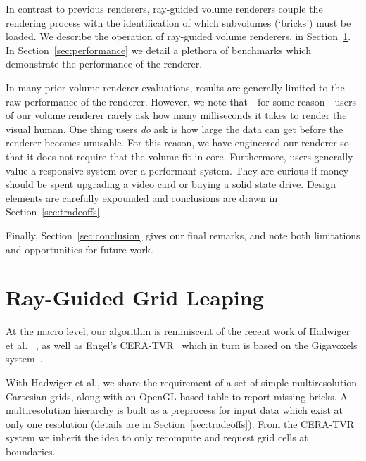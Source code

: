
In contrast to previous renderers, ray-guided volume renderers couple
the rendering process with the identification of which subvolumes
(`bricks') must be loaded.  We describe the operation of ray-guided
volume renderers, in Section~\ref{sec:algorithm}.
In Section~\ref{sec:performance} we detail a plethora of benchmarks
which demonstrate the performance of the renderer.

In many prior volume renderer evaluations, results are generally
limited to the raw performance of the renderer.  However, we note
that---for some reason---users of our volume renderer rarely ask how
many milliseconds it takes
to render the visual human.  One thing users \emph{do} ask is how large
the data can get before the renderer becomes unusable. For this reason,
we have engineered our renderer so that it does not require that the
volume fit in core.  Furthermore, users generally value a responsive
system over a performant system.  They are curious if money should be
spent upgrading a video card or buying a solid state drive.  Design
elements are carefully expounded and conclusions are drawn in
Section~\ref{sec:tradeoffs}.

Finally, Section~\ref{sec:conclusion} gives our final remarks, and note
both limitations and opportunities for future work.

\section{Ray-Guided Grid Leaping}
\label{sec:algorithm}

At the macro level, our algorithm is reminiscent of the recent work of
Hadwiger et
al. ~\cite{Hadwiger:2012:Guided}, as well as Engel's
CERA-TVR~\cite{Engel:2012:CERA} which in turn is based on the
Gigavoxels
system~\cite{Crassin:2009:Gigavoxels}.

With Hadwiger et al., we share the requirement of a set of simple
multiresolution Cartesian grids, along with an OpenGL-based table
to report missing bricks.  A multiresolution hierarchy is built as a
preprocess for input data which exist at only one resolution (details
are in Section~\ref{sec:tradeoffs}).  From the CERA-TVR system
we inherit the idea to only recompute and request grid cells at
boundaries.

